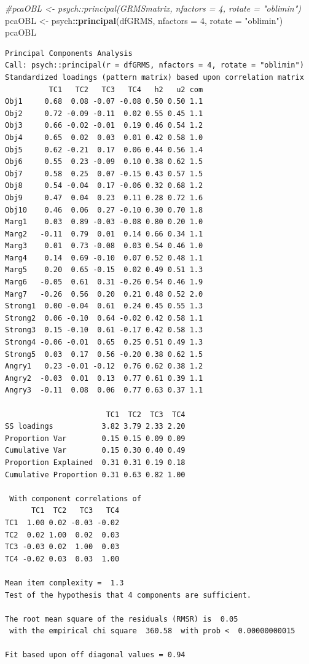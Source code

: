 \documentclass[
  english,
]{book}
\newenvironment{Shaded}{\begin{snugshade}}{\end{snugshade}}
\newcommand{\CommentTok}[1]{\textcolor[rgb]{0.56,0.35,0.01}{\textit{#1}}}
\newcommand{\DataTypeTok}[1]{\textcolor[rgb]{0.13,0.29,0.53}{#1}}
\newcommand{\DecValTok}[1]{\textcolor[rgb]{0.00,0.00,0.81}{#1}}
\newcommand{\KeywordTok}[1]{\textcolor[rgb]{0.13,0.29,0.53}{\textbf{#1}}}
\newcommand{\NormalTok}[1]{#1}
\newcommand{\OperatorTok}[1]{\textcolor[rgb]{0.81,0.36,0.00}{\textbf{#1}}}
\newcommand{\StringTok}[1]{\textcolor[rgb]{0.31,0.60,0.02}{#1}}
\begin{document}
\begin{Shaded}
\begin{Highlighting}[]
\CommentTok{#pcaOBL <- psych::principal(GRMSmatrix, nfactors = 4, rotate = "oblimin")}
\NormalTok{pcaOBL <-}\StringTok{ }\NormalTok{psych}\OperatorTok{::}\KeywordTok{principal}\NormalTok{(dfGRMS, }\DataTypeTok{nfactors =} \DecValTok{4}\NormalTok{, }\DataTypeTok{rotate =} \StringTok{"oblimin"}\NormalTok{)}
\NormalTok{pcaOBL}
\end{Highlighting}
\end{Shaded}

\begin{verbatim}
Principal Components Analysis
Call: psych::principal(r = dfGRMS, nfactors = 4, rotate = "oblimin")
Standardized loadings (pattern matrix) based upon correlation matrix
          TC1   TC2   TC3   TC4   h2   u2 com
Obj1     0.68  0.08 -0.07 -0.08 0.50 0.50 1.1
Obj2     0.72 -0.09 -0.11  0.02 0.55 0.45 1.1
Obj3     0.66 -0.02 -0.01  0.19 0.46 0.54 1.2
Obj4     0.65  0.02  0.03  0.01 0.42 0.58 1.0
Obj5     0.62 -0.21  0.17  0.06 0.44 0.56 1.4
Obj6     0.55  0.23 -0.09  0.10 0.38 0.62 1.5
Obj7     0.58  0.25  0.07 -0.15 0.43 0.57 1.5
Obj8     0.54 -0.04  0.17 -0.06 0.32 0.68 1.2
Obj9     0.47  0.04  0.23  0.11 0.28 0.72 1.6
Obj10    0.46  0.06  0.27 -0.10 0.30 0.70 1.8
Marg1    0.03  0.89 -0.03 -0.08 0.80 0.20 1.0
Marg2   -0.11  0.79  0.01  0.14 0.66 0.34 1.1
Marg3    0.01  0.73 -0.08  0.03 0.54 0.46 1.0
Marg4    0.14  0.69 -0.10  0.07 0.52 0.48 1.1
Marg5    0.20  0.65 -0.15  0.02 0.49 0.51 1.3
Marg6   -0.05  0.61  0.31 -0.26 0.54 0.46 1.9
Marg7   -0.26  0.56  0.20  0.21 0.48 0.52 2.0
Strong1  0.00 -0.04  0.61  0.24 0.45 0.55 1.3
Strong2  0.06 -0.10  0.64 -0.02 0.42 0.58 1.1
Strong3  0.15 -0.10  0.61 -0.17 0.42 0.58 1.3
Strong4 -0.06 -0.01  0.65  0.25 0.51 0.49 1.3
Strong5  0.03  0.17  0.56 -0.20 0.38 0.62 1.5
Angry1   0.23 -0.01 -0.12  0.76 0.62 0.38 1.2
Angry2  -0.03  0.01  0.13  0.77 0.61 0.39 1.1
Angry3  -0.11  0.08  0.06  0.77 0.63 0.37 1.1

                       TC1  TC2  TC3  TC4
SS loadings           3.82 3.79 2.33 2.20
Proportion Var        0.15 0.15 0.09 0.09
Cumulative Var        0.15 0.30 0.40 0.49
Proportion Explained  0.31 0.31 0.19 0.18
Cumulative Proportion 0.31 0.63 0.82 1.00

 With component correlations of 
      TC1  TC2   TC3   TC4
TC1  1.00 0.02 -0.03 -0.02
TC2  0.02 1.00  0.02  0.03
TC3 -0.03 0.02  1.00  0.03
TC4 -0.02 0.03  0.03  1.00

Mean item complexity =  1.3
Test of the hypothesis that 4 components are sufficient.

The root mean square of the residuals (RMSR) is  0.05 
 with the empirical chi square  360.58  with prob <  0.00000000015 

Fit based upon off diagonal values = 0.94
\end{verbatim}
\end{document}
